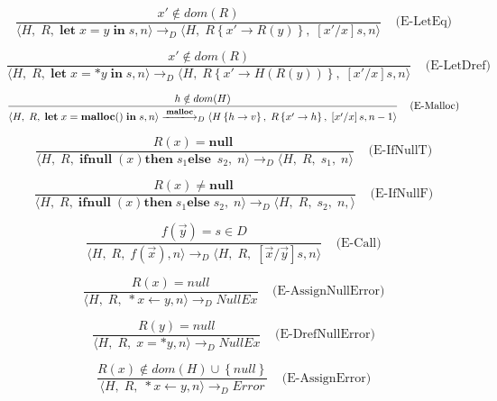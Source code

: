 \documentclass[english]{jssst_ppl} %
\newcommand\LET{\mathbf{let}\;}
\newcommand\IN{\mathbf{in}\;}
\newcommand\Rtab{\; \; \; \;}
\newcommand\NULL{\mathbf{null}\;}
\newcommand\IFNULL{\mathbf{ifnull}\;}
\newcommand\THEN{\mathbf{then}\;}
\newcommand\ELSE{\mathbf{else}\;}
\newcommand\Lfc{\left\{}
\newcommand\Rfc{\right\}}
\newcommand\Lb{\left[}
\newcommand\Rb{\right]}
\newcommand\coma{,\;}
\newcommand\Malloc{\mathbf{malloc}}
\newcommand\Cirx{(x)}
\begin{document}
$$
     \frac{x' \notin dom(R)}
            {\langle H\coma R\coma \LET x = y \; \IN s , n \rangle
              \longrightarrow_{D}
              \langle H\coma R\Lfc x' \rightarrow R(y) \Rfc \coma   \Lb x'/x \Rb s , n  \rangle }
\Rtab \mbox{(E-LetEq)}
$$

$$
     \frac{x' \notin dom(R)}
            {\langle H\coma R\coma  \LET x = *y \; \IN s , n \rangle
              \longrightarrow_{D}
              \langle H\coma R\Lfc x' \rightarrow H(R(y)) \Rfc \coma   \Lb x'/x \Rb s , n  \rangle }
     \Rtab \mbox{(E-LetDref)}
$$

$$
     \frac{h \notin dom(H)}
            {\langle H\coma R\coma  \LET x = \Malloc() \; \IN s , n \rangle
              \xlongrightarrow{\Malloc}_{D}
              \langle H \Lfc h \rightarrow v\Rfc \coma R\Lfc x' \rightarrow h \Rfc \coma   \Lb x'/x \Rb s , n-1  \rangle }
\Rtab \mbox{(E-Malloc)}
$$

$$
    \frac{R(x) = \NULL}
           {\langle H \coma R \coma \IFNULL\Cirx   \THEN   s_{1} \ELSE\  s_{2} \coma  n \rangle
           \longrightarrow_{D}
           \langle H\coma R\coma s_{1} \coma n \rangle}
    \Rtab \mbox{(E-IfNullT)}
$$

$$
    \frac{R(x) \neq \NULL}
           {\langle H \coma R \coma \IFNULL\Cirx \THEN  s_{1} \ELSE  s_{2} \coma  n \rangle
           \longrightarrow_{D}
           \langle H\coma R\coma s_{2} \coma  n, \rangle}
    \Rtab \mbox{(E-IfNullF)}
$$

$$
     \frac{f(\vec{y}) = s \in D}
            { \langle H\coma R\coma  f(\vec{x}) , n \rangle
               \longrightarrow_{D}
               \langle H\coma R\coma  \Lb \vec{x}/\vec{y} \Rb s , n \rangle}
      \Rtab \mbox{(E-Call)}
$$

$$
      \frac{R(x) = null}
            {\langle H\coma R\coma  *x \leftarrow y , n \rangle
              \longrightarrow_{D}
              NullEx }
      \Rtab \mbox{(E-AssignNullError)}
$$

$$
      \frac{R(y) = null}
             {\langle H\coma R\coma  x = *y, n \rangle
               \longrightarrow_{D}
               NullEx }
             \Rtab \mbox{(E-DrefNullError)}
$$

$$
     \frac{R(x) \notin dom(H) \cup \Lfc null \Rfc}
           {\langle H\coma R\coma   *x \leftarrow y,  n \rangle
             \longrightarrow_{D}
             Error }
    \Rtab \mbox{(E-AssignError)}
$$
\end{document}
